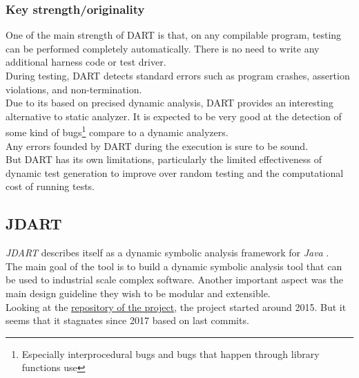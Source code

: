 \documentclass[11pt]{IEEEtran}
\begin{document}
	    \subsubsection{Key strength/originality}
	    	One of the main strength of DART is that, on any compilable program, testing can be performed completely automatically. There is no need to write any additional harness code or test driver.\\
	    	During testing, DART detects standard errors such as program crashes, assertion violations, and non-termination.\\
	    	Due to its based on precised dynamic analysis, DART provides an interesting alternative to static analyzer. It is expected to be very good at the detection of some kind of bugs\footnote{Especially  interprocedural bugs and bugs that happen through library functions use} compare to a dynamic analyzers.\\
	    	Any errors founded by DART during the execution is sure to be sound.\\

	    	But DART has its own limitations, particularly the limited effectiveness of dynamic test generation to improve over random testing and the computational cost of running tests.
	    	
	\subsection{JDART}
		\emph{JDART} describes itself as a dynamic symbolic analysis framework for \emph{Java} \cite{jDart}.\\
		The main goal of the tool is to build a dynamic symbolic analysis tool that can be used to industrial scale complex software. Another important aspect was the main design guideline they wish to be modular and extensible.\\
		
		
		Looking at the \href{https://github.com/psycopaths/jdart}{repository of the project}, the project started around 2015. But it seems that it stagnates since 2017 based on last commits.
		
\end{document}
